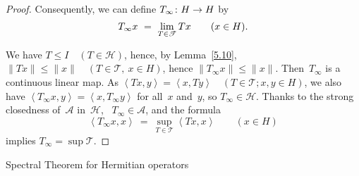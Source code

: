 \documentclass[main.tex]{subfiles}
\begin{document}
\begin{proof}
Consequently,
we can define $T_\infty\colon H\rightarrow H$ by
\begin{equation*}
T_\infty x\ =\ \lim_{T\in \mathscr T} Tx\qquad (x\in H)\text{.}
\end{equation*}

We have $T\leq I\quad(T\in\mathscr H)$,
hence, by Lemma~\ref{5.10}, $\|Tx\|\leq\|x\|\quad(T\in\mathscr T,\ x\in H)$,
hence $\|T_\infty x\|\leq\|x\|$.
Then~$T_\infty$ is a continuous linear map.
As $\left<Tx,y\right>=\left<x,Ty\right>\quad(T\in\mathscr T; x,y\in H)$,
we also have $\left<T_\infty x,y\right> = \left<x,T_\infty y\right>$
for all~$x$ and~$y$, so $T_\infty\in\mathscr H$.
Thanks to the strong closedness of~$\mathscr A$ in~$\mathscr H$, \ 
$T_\infty\in\mathscr A$, and the formula
\begin{equation*}
\left<T_\infty x,x\right>\ 
=\ \sup_{T\in\mathscr T} \left<Tx,x\right>\qquad(x\in H)
\end{equation*}
implies $T_\infty = \sup \mathscr T$. \xqed
\end{proof}
%
%
\begin{psec}{7.14}{Spectral Theorem for Hermitian operators}\end{psec}
\end{document}
